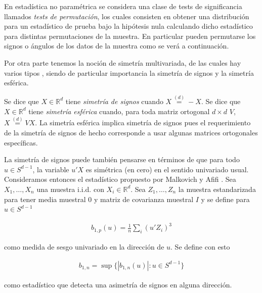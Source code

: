 \documentclass[letter]{article}
\begin{document}


\setlength{\parskip}{8pt}
\setlength{\parindent}{0.5in}


En estadística no paramétrica se considera una clase de tests de significancia llamados \emph{tests de permutación}, los cuales consisten en obtener una distribución para un estadístico de prueba bajo la hipótesis nula calculando dicho estadístico para distintas permutaciones de la muestra. En particular pueden permutarse los signos o ángulos de los datos de la muestra como se verá a continuación.

Por otra parte tenemos la noción de simetría multivariada, de las cuales hay varios tipos \cite{SerflingMultivariateAsymmetry}, siendo de particular importancia la simetría de signos y la simetría esférica.

Se dice que $X \in \mathbb{R}^d$ tiene \emph{simetría de signos} cuando $X \overset{(d)}{=} -X$. Se dice que $X \in \mathbb{R}^d$ tiene \emph{simetría
esférica} cuando, para toda matriz ortogonal $d \times d$ $V$, $X \overset{(d)}{=} VX$. La simetría esférica implica simetría de signos pues el requerimiento de la simetría de signos de hecho corresponde a usar algunas matrices ortogonales específicas.

La simetría de signos puede también pensarse en términos de que para todo $u \in S^{d-1}$, la variable $u'X$ es simétrica (en cero) en el sentido univariado usual. Consideramos entonces el estadístico propuesto por Malkovich y Afifi \cite{Malkovich1973OnNormality}. Sea $X_1,\dots,X_n$ una muestra i.i.d. con $X_i \in \mathbb{R}^d$. Sea $Z_1,\dots,Z_n$ la muestra estandarizada para tener media muestral $0$ y matriz de covarianza muestral $I$ y se define para $u \in S^{d-1}$

\begin{align*}
    b_{1,p}(u) = \frac{1}{n}\sum_i (u'Z_i)^3
\end{align*}

como medida de sesgo univariado en la dirección de $u$. Se define con esto

\begin{align*}
    b_{1,n} = \sup\{|b_{1,n}(u)| : u \in S^{d-1}\}
\end{align*}

como estadístico que detecta una asimetría de signos en alguna dirección.
\end{document}
